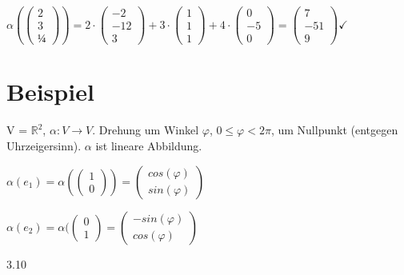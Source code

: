 \documentclass[a4paper, openany]{book}
\begin{document}
      $\alpha(\begin{pmatrix}2 \\3 \\¼ \end{pmatrix}) = 2 \cdot \begin{pmatrix}-2 \\ -12\\ 3 \end{pmatrix} + 3 \cdot \begin{pmatrix}1 \\ 1 \\ 1 \end{pmatrix} + 4 \cdot \begin{pmatrix}0 \\ -5 \\ 0 \end{pmatrix} = \begin{pmatrix}7 \\ -51 \\9 \end{pmatrix} \checkmark$

      \section{Beispiel}

      V = $\mathbb{R}^2$, $\alpha: V \rightarrow V$. Drehung um Winkel $\varphi$, $0 \le \varphi < 2 \pi$, um Nullpunkt (entgegen Uhrzeigersinn). $\alpha$ ist lineare Abbildung. 

      \par \medskip

      $\alpha(e_1) = \alpha(\begin{pmatrix}1 \\ 0 \end{pmatrix}) = \begin{pmatrix}cos(\varphi) \\ sin(\varphi) \end{pmatrix}$

      \par \medskip

      $\alpha(e_2) = \alpha(\begin{pmatrix}0 \\ 1 \end{pmatrix} = \begin{pmatrix}-sin(\varphi) \\ cos(\varphi)\end{pmatrix}$

      3.10
\end{document}
